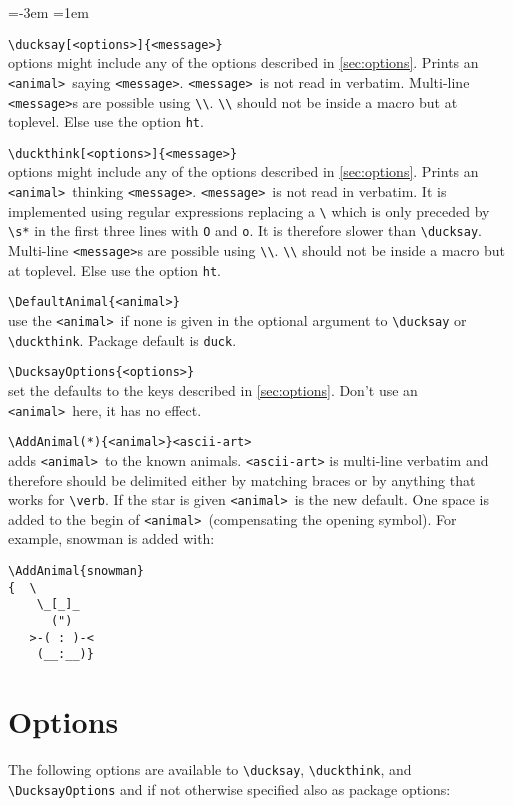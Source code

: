 \documentclass[a4paper,10pt]{article}
\newcommand*{\anml}{\texttt{<animal>}}
\newcommand*{\msg}{\texttt{<message>}}
\newenvironment{codedescription}{%
  \parindent=-3em%
  \parskip=1em%
  \par%
}{}
\begin{document}
\begin{codedescription}
\verb|\ducksay[<options>]{<message>}|\\
  options might include any of the options described in
  \autoref{sec:options}. Prints an \anml\ saying \msg. \msg\ is not read in
  verbatim. Multi-line \msg s are possible using \verb|\\|. \verb|\\| should not
  be inside a macro but at toplevel. Else use the option \texttt{ht}.

\verb|\duckthink[<options>]{<message>}|\\
  options might include any of the options described in
  \autoref{sec:options}. Prints an \anml\ thinking \msg. \msg\ is not read in
  verbatim. It is implemented using regular expressions replacing a \verb|\|
  which is only preceded by \verb|\s*| in the first three lines with \verb|O|
  and \verb|o|. It is therefore slower than \verb|\ducksay|. Multi-line \msg s
  are possible using \verb|\\|. \verb|\\| should not be inside a macro but at
  toplevel. Else use the option \texttt{ht}.

\verb|\DefaultAnimal{<animal>}|\\
  use the \anml\ if none is given in the optional argument to \verb|\ducksay| or
  \verb|\duckthink|. Package default is \texttt{duck}.

\verb|\DucksayOptions{<options>}|\\
  set the defaults to the keys described in \autoref{sec:options}. Don't use an
  \anml\ here, it has no effect.

\verb|\AddAnimal(*){<animal>}<ascii-art>|\\
  adds \anml\ to the known animals. \texttt{<ascii-art>} is multi-line verbatim
  and therefore should be delimited either by matching braces or by anything
  that works for \verb|\verb|. If the star is given \anml\ is the new default.
  One space is added to the begin of \anml\ (compensating the opening symbol).
  For example, snowman is added with:\\[1ex]
  \begin{minipage}{\linewidth}
\begin{verbatim}
\AddAnimal{snowman}
{  \
    \_[_]_
      (")
   >-( : )-<
    (__:__)}
\end{verbatim}
  \end{minipage}
\end{codedescription}
\section{Options}\label{sec:options}%
{\reversemarginpar{}}
The following options are available to \verb|\ducksay|, \verb|\duckthink|, and
\verb|\DucksayOptions| and if not otherwise specified also as package options:
\end{document}
